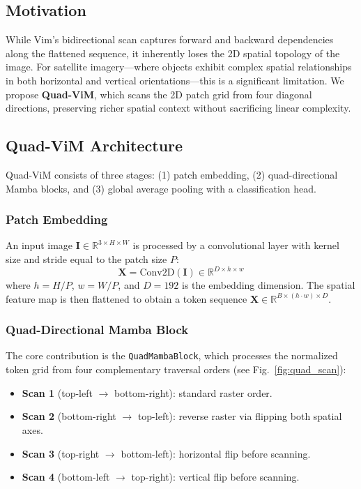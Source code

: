 \documentclass[conference]{IEEEtran}
\begin{document}
\subsection{Motivation}

While Vim's bidirectional scan captures forward and backward dependencies along the flattened sequence, it inherently loses the 2D spatial topology of the image. For satellite imagery---where objects exhibit complex spatial relationships in both horizontal and vertical orientations---this is a significant limitation. We propose \textbf{Quad-ViM}, which scans the 2D patch grid from four diagonal directions, preserving richer spatial context without sacrificing linear complexity.

\subsection{Quad-ViM Architecture}

Quad-ViM consists of three stages: (1) patch embedding, (2) quad-directional Mamba blocks, and (3) global average pooling with a classification head.

\subsubsection{Patch Embedding}
An input image $\mathbf{I} \in \mathbb{R}^{3 \times H \times W}$ is processed by a convolutional layer with kernel size and stride equal to the patch size $P$:
\begin{equation}
\mathbf{X} = \text{Conv2D}(\mathbf{I}) \in \mathbb{R}^{D \times h \times w}
\end{equation}
where $h = H/P$, $w = W/P$, and $D = 192$ is the embedding dimension. The spatial feature map is then flattened to obtain a token sequence $\mathbf{X} \in \mathbb{R}^{B \times (h \cdot w) \times D}$.

\subsubsection{Quad-Directional Mamba Block}
The core contribution is the \texttt{QuadMambaBlock}, which processes the normalized token grid from four complementary traversal orders (see Fig.~\ref{fig:quad_scan}):

\begin{itemize}
\item \textbf{Scan 1} (top-left $\to$ bottom-right): standard raster order.
\item \textbf{Scan 2} (bottom-right $\to$ top-left): reverse raster via flipping both spatial axes.
\item \textbf{Scan 3} (top-right $\to$ bottom-left): horizontal flip before scanning.
\item \textbf{Scan 4} (bottom-left $\to$ top-right): vertical flip before scanning.
\end{itemize}
\end{document}
